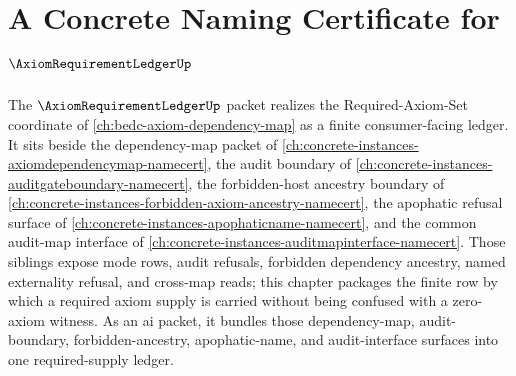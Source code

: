 \chapter{A Concrete Naming Certificate for $\AxiomRequirementLedgerUp$}
\label{ch:concrete-instances-axiom-requirement-ledger-namecert}

The $\AxiomRequirementLedgerUp$ packet realizes the Required-Axiom-Set coordinate of \autoref{ch:bedc-axiom-dependency-map} as a finite consumer-facing ledger. It sits beside the dependency-map packet of \autoref{ch:concrete-instances-axiomdependencymap-namecert}, the audit boundary of \autoref{ch:concrete-instances-auditgateboundary-namecert}, the forbidden-host ancestry boundary of \autoref{ch:concrete-instances-forbidden-axiom-ancestry-namecert}, the apophatic refusal surface of \autoref{ch:concrete-instances-apophaticname-namecert}, and the common audit-map interface of \autoref{ch:concrete-instances-auditmapinterface-namecert}. Those siblings expose mode rows, audit refusals, forbidden dependency ancestry, named externality refusal, and cross-map reads; this chapter packages the finite row by which a required axiom supply is carried without being confused with a zero-axiom witness.
As an ai packet, it bundles those dependency-map, audit-boundary,
forbidden-ancestry, apophatic-name, and audit-interface surfaces into one
required-supply ledger.

